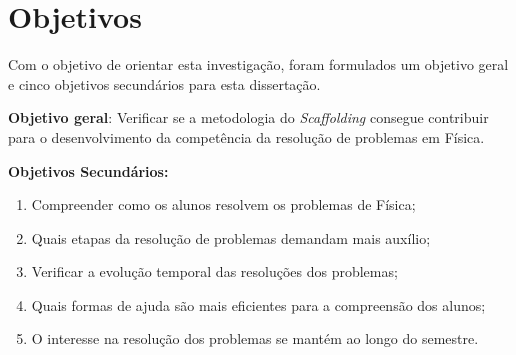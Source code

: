 \section{Objetivos}

Com o objetivo de orientar esta investigação, foram formulados um objetivo geral e cinco objetivos secundários para esta dissertação.

\textbf{Objetivo geral}: Verificar se a metodologia do \textit{Scaffolding} consegue contribuir para o desenvolvimento da competência da resolução de problemas em Física.

 
\textbf{Objetivos Secundários:}

\begin{enumerate}[label=\alph*)]
    \item \label{item:a} Compreender como os alunos resolvem os problemas de Física; 
    \item \label{item:b} Quais etapas da resolução de problemas demandam mais auxílio; 
    \item  \label{item:c} Verificar a evolução temporal das resoluções dos problemas; 
    \item \label{item:d} Quais formas de ajuda são mais eficientes para a compreensão dos alunos;
    \item \label{item:e} O interesse na resolução dos problemas se mantém ao longo do semestre.
\end{enumerate}